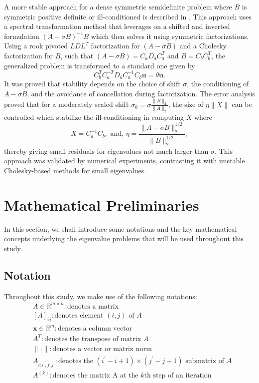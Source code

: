 A more stable approach for a dense symmetric semidefinite problem where $B$ is symmetric positive definite or ill-conditioned is described in \cite{5b3d5fb1-4813-3046-9331-a730b392f611}. This approach uses a spectral transformation method that leverages on a shifted and inverted formulation $(A-\sigma B)^{-1}B$ which then solves it using symmetric factorizations. Using a rook pivoted $LDL^T$ factorization for $(A-\sigma B)$ and a Cholesky factorization for $B$, such that $(A-\sigma B) = C_aD_aC_a^T$ and $B = C_bC_b^T$, the generalized problem is transformed to a standard one given by 
\begin{equation}
	C_b^TC_a^{-T}D_aC_a^{-1}C_b \mathbf{u} = \theta \mathbf{u}.
\end{equation}
It was proved that stability depends on the choice of shift $\sigma$, the conditioning of $A - \sigma B$, and the avoidance of cancellation during factorization. The error analysis proved that for a moderately scaled shift $\sigma_0 = \sigma \frac{\|B\|_2}{\|A\|_2}$, the size of $\eta \|X\|$ can be controlled which stabilize the ill-conditioning in computing $X$ where 
\begin{equation}
	X = C_a^{-1}C_b, \text{ and, } \eta = \frac{\|A - \sigma B\|_2^{1/2}}{\|B\|_2^{1/2}},
\end{equation}
thereby giving small residuals for eigenvalues not much larger than $\sigma$. This approach was validated by numerical experiments, contrasting it with unstable Cholesky-based methods for small eigenvalues.

\section{Mathematical Preliminaries}\label{sec:MathPrelim}
In this section, we shall introduce some notations and the key mathematical concepts underlying the eigenvalue problems that will be used throughout this study.
\subsection{Notation}
Throughout this study, we make use of the following notations:
\begin{align*}\nonumber
	&A \in \mathbb{R}^{m\times n}: \text{denotes a matrix}\\
	&[A]_{ij}: \text{denotes element $(i, j)$ of $A$}\\
	&\mathbf{x} \in \mathbb{R}^{m}: \text{denotes a column vector}\\
	&A^{T}: \text{denotes the transpose of matrix $A$}\\
	&\| \cdot \|: \text{denotes a vector or matrix norm }\\
	&A_{i:i^\prime, j:j^\prime}: \text{denotes the $(i^\prime - i + 1) \times (j^\prime - j + 1)$ submatrix of $A$}\\
	&A^{(k)}: \text{denotes the matrix A at the $k$th step of an iteration}
\end{align*}
